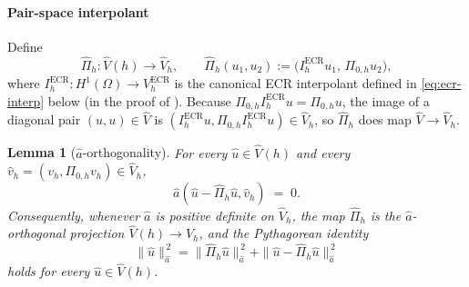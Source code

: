 \documentclass[11pt]{article}
\theoremstyle{plain}
\newtheorem{lemma}{Lemma}
\theoremstyle{definition}
\theoremstyle{remark}
\newcommand{\ECR}{\mathrm{ECR}}
\begin{document}
\paragraph{Pair-space interpolant}
Define
\begin{equation}
\label{eq:pair-interp}
  \widehat\Pi_h:\widehat V(h)\to\widehat V_h,
  \qquad
  \widehat\Pi_h(u_1,u_2) := \bigl(I_h^{\ECR}u_1,\,\Pi_{0,h}u_2\bigr),
\end{equation}
where $I_h^{\ECR}:H^1(\Omega)\to V_h^{\ECR}$ is the canonical ECR
interpolant defined in \eqref{eq:ecr-interp} below (in the proof of
). Because $\Pi_{0,h}I_h^{\ECR}u
=\Pi_{0,h}u$, the image of a diagonal pair $(u,u)\in\widehat V$ is
$(I_h^{\ECR}u,\Pi_{0,h}I_h^{\ECR}u)\in\widehat V_h$, so
$\widehat\Pi_h$ does map $\widehat V\to\widehat V_h$.

\begin{lemma}[$\widehat a$-orthogonality]
\label{lem:pair-orthogonality}
For every $\widehat u\in\widehat V(h)$ and every
$\widehat v_h=(v_h,\Pi_{0,h}v_h)\in\widehat V_h$,
\begin{equation}
\label{eq:pair-orth}
  \widehat a(\widehat u-\widehat\Pi_h\widehat u,\widehat v_h) \;=\; 0.
\end{equation}
Consequently, whenever $\widehat a$ is positive definite on
$\widehat V_h$, the map $\widehat\Pi_h$ is the $\widehat a$-orthogonal
projection $\widehat V(h)\to\widehat V_h$, and the Pythagorean identity
\begin{equation}
\label{eq:pair-pythagoras}
  \|\widehat u\|_{\widehat a}^{\,2}
  = \|\widehat\Pi_h\widehat u\|_{\widehat a}^{\,2}
  + \|\widehat u-\widehat\Pi_h\widehat u\|_{\widehat a}^{\,2}
\end{equation}
holds for every $\widehat u\in\widehat V(h)$.
\end{lemma}
\end{document}
